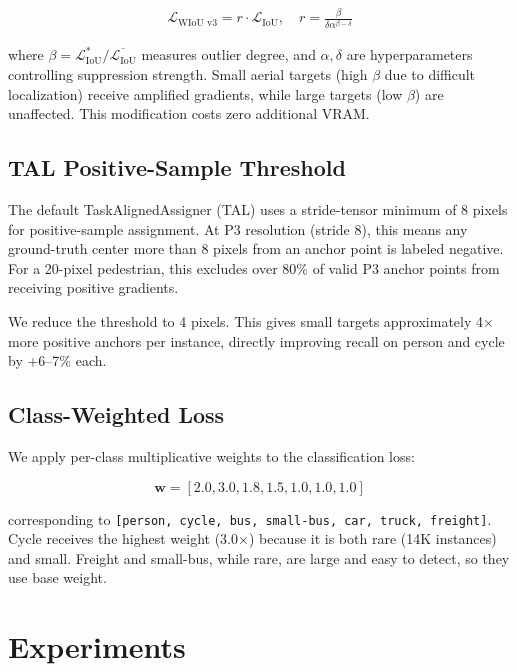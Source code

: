 \documentclass[11pt]{article}
\begin{document}
\begin{align}
    \mathcal{L}_{\text{WIoU v3}} = r \cdot \mathcal{L}_{\text{IoU}},
    \quad r = \frac{\beta}{\delta \alpha^{\beta - \delta}}
\end{align}

where $\beta = \mathcal{L}_{\text{IoU}}^* / \overline{\mathcal{L}_{\text{IoU}}}$ measures
outlier degree, and $\alpha, \delta$ are hyperparameters controlling suppression strength.
Small aerial targets (high $\beta$ due to difficult localization) receive amplified gradients,
while large targets (low $\beta$) are unaffected. This modification costs zero additional VRAM.

\subsection{TAL Positive-Sample Threshold}

The default TaskAlignedAssigner (TAL) \cite{feng2021toad} uses a stride-tensor minimum of 8 pixels
for positive-sample assignment. At P3 resolution (stride 8), this means any ground-truth center
more than 8 pixels from an anchor point is labeled negative. For a 20-pixel pedestrian, this
excludes over 80\% of valid P3 anchor points from receiving positive gradients.

We reduce the threshold to 4 pixels. This gives small targets approximately 4$\times$ more
positive anchors per instance, directly improving recall on person and cycle by +6--7\% each.

\subsection{Class-Weighted Loss}

We apply per-class multiplicative weights to the classification loss:

\begin{equation}
    \mathbf{w} = [2.0, 3.0, 1.8, 1.5, 1.0, 1.0, 1.0]
\end{equation}

corresponding to \texttt{[person, cycle, bus, small-bus, car, truck, freight]}. Cycle receives
the highest weight (3.0$\times$) because it is both rare (14K instances) and small. Freight and
small-bus, while rare, are large and easy to detect, so they use base weight.

\section{Experiments}
\label{sec:experiments}
\end{document}
